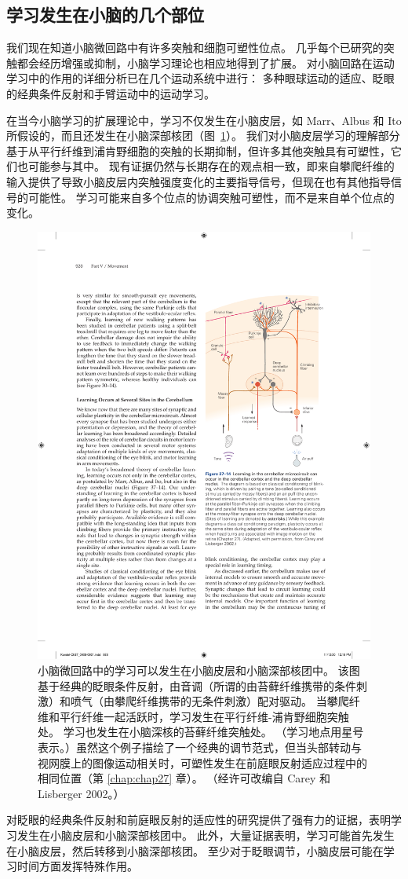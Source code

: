 \subsection{学习发生在小脑的几个部位}

我们现在知道小脑微回路中有许多突触和细胞可塑性位点。
几乎每个已研究的突触都会经历增强或抑制，小脑学习理论也相应地得到了扩展。
对小脑回路在运动学习中的作用的详细分析已在几个运动系统中进行：
多种眼球运动的适应、眨眼的经典条件反射和手臂运动中的运动学习。


在当今小脑学习的扩展理论中，学习不仅发生在小脑皮层，如 Marr、Albus 和 Ito 所假设的，而且还发生在小脑深部核团（图~\ref{fig:37_14}）。
我们对小脑皮层学习的理解部分基于从平行纤维到浦肯野细胞的突触的长期抑制，但许多其他突触具有可塑性，它们也可能参与其中。
现有证据仍然与长期存在的观点相一致，即来自攀爬纤维的输入提供了导致小脑皮层内突触强度变化的主要指导信号，但现在也有其他指导信号的可能性。
学习可能来自多个位点的协调突触可塑性，而不是来自单个位点的变化。


\begin{figure}[htbp]
	\centering
	\includegraphics[width=0.5\linewidth]{chap37/fig_37_14}
	\caption{小脑微回路中的学习可以发生在小脑皮层和小脑深部核团中。 该图基于经典的眨眼条件反射，由音调（所谓的由苔藓纤维携带的条件刺激）和喷气（由攀爬纤维携带的无条件刺激）配对驱动。 当攀爬纤维和平行纤维一起活跃时，学习发生在平行纤维-浦肯野细胞突触处。 学习也发生在小脑深核的苔藓纤维突触处。 （学习地点用星号表示。）虽然这个例子描绘了一个经典的调节范式，但当头部转动与视网膜上的图像运动相关时，可塑性发生在前庭眼反射适应过程中的相同位置（第 \ref{chap:chap27} 章）。 （经许可改编自 Carey 和 Lisberger 2002。）}
	\label{fig:37_14}
\end{figure}


对眨眼的经典条件反射和前庭眼反射的适应性的研究提供了强有力的证据，表明学习发生在小脑皮层和小脑深部核团中。
此外，大量证据表明，学习可能首先发生在小脑皮层，然后转移到小脑深部核团。
至少对于眨眼调节，小脑皮层可能在学习时间方面发挥特殊作用。


